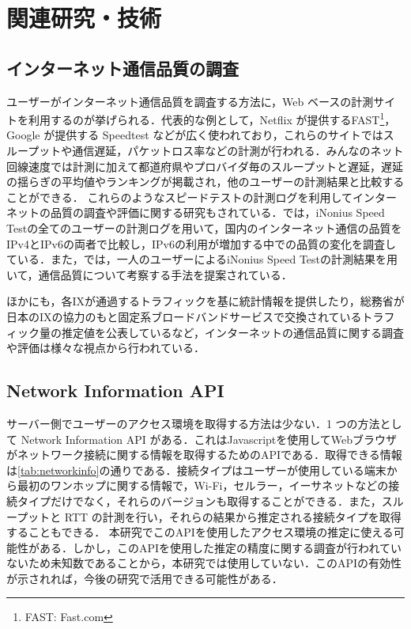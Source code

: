 \chapter{関連研究・技術}
\label{chap:relatedwork}

\section{インターネット通信品質の調査}
ユーザーがインターネット通信品質を調査する方法に，Web ベースの計測サイトを利用するのが挙げられる．代表的な例として，Netflix が提供するFAST\footnote{FAST: Fast.com}，Google が提供する Speedtest などが広く使われており，これらのサイトではスループットや通信遅延，パケットロス率などの計測が行われる．みんなのネット回線速度\cite{minsoku}では計測に加えて都道府県やプロバイダ毎のスループットと遅延，遅延の揺らぎの平均値やランキングが掲載され，他のユーザーの計測結果と比較することができる．
これらのようなスピードテストの計測ログを利用してインターネットの品質の調査や評価に関する研究もされている．\cite{yasnyan}では，iNonius Speed Test\cite{iNonius}の全てのユーザーの計測ログを用いて，国内のインターネット通信の品質をIPv4とIPv6の両者で比較し，IPv6の利用が増加する中での品質の変化を調査している．また，\cite{reisan}では，一人のユーザーによるiNonius Speed Testの計測結果を用いて，通信品質について考察する手法を提案されている．

ほかにも，各IXが通過するトラフィックを基に統計情報を提供\cite{IIR}したり，総務省が日本のIXの協力のもと固定系ブロードバンドサービスで交換されているトラフィック量の推定値を公表している\cite{soumusho}など，インターネットの通信品質に関する調査や評価は様々な視点から行われている．

\section{Network Information API}
サーバー側でユーザーのアクセス環境を取得する方法は少ない．1 つの方法として Network Information API\cite{networkInformationAPI} がある．これはJavascriptを使用してWebブラウザがネットワーク接続に関する情報を取得するためのAPIである．取得できる情報は\cref{tab:networkinfo}の通りである．接続タイプはユーザーが使用している端末から最初のワンホップに関する情報で，Wi-Fi，セルラー，イーサネットなどの接続タイプだけでなく，それらのバージョンも取得することができる．また，スループットと RTT の計測を行い，それらの結果から推定される接続タイプを取得することもできる．
本研究でこのAPIを使用したアクセス環境の推定に使える可能性がある．しかし，このAPIを使用した推定の精度に関する調査が行われていないため未知数であることから，本研究では使用していない．このAPIの有効性が示されれば，今後の研究で活用できる可能性がある．

